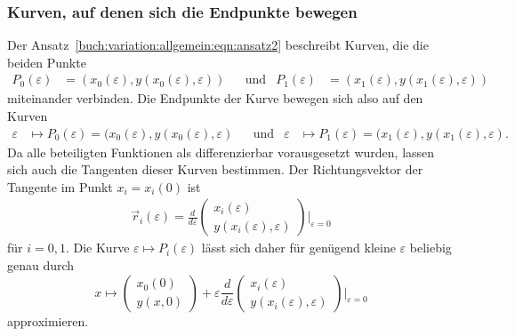 \subsubsection{Kurven, auf denen sich die Endpunkte bewegen}
Der Ansatz~\eqref{buch:variation:allgemein:eqn:ansatz2} beschreibt
Kurven, die die beiden Punkte
\begin{align*}
P_0(\varepsilon)
&=
(x_0(\varepsilon),y(x_0(\varepsilon),\varepsilon))
&&\text{und}&
P_1(\varepsilon)
&=
(x_1(\varepsilon),y(x_1(\varepsilon),\varepsilon))
\end{align*}
miteinander verbinden.
Die Endpunkte der Kurve bewegen sich also auf den Kurven
\begin{align*}
\varepsilon
&\mapsto
P_0(\varepsilon)
=
(x_0(\varepsilon),y(x_0(\varepsilon),\varepsilon)
&&\text{und}&
\varepsilon
&\mapsto
P_1(\varepsilon)
=
(x_1(\varepsilon),y(x_1(\varepsilon),\varepsilon).
\end{align*}
Da alle beteiligten Funktionen als differenzierbar vorausgesetzt wurden,
lassen sich auch die Tangenten dieser Kurven bestimmen.
Der Richtungsvektor der Tangente im Punkt $x_i=x_i(0)$ ist
\begin{align}
\vec{r}_i(\varepsilon)
=
\frac{d}{d\varepsilon}
\begin{pmatrix}
x_i(\varepsilon)\\
y(x_i(\varepsilon),\varepsilon)
\end{pmatrix}
\bigg|_{\varepsilon=0}
\label{buch:variation:allgemein:eqn:tangential}
\end{align}
für $i=0,1$.
Die Kurve $\varepsilon\mapsto P_i(\varepsilon)$ lässt sich daher für
genügend kleine $\varepsilon$ beliebig genau durch
\[
x\mapsto
\begin{pmatrix}
x_0(0)\\
y(x,0) 
\end{pmatrix}
+
\varepsilon
\frac{d}{d\varepsilon}
\begin{pmatrix}
x_i(\varepsilon)\\
y(x_i(\varepsilon),\varepsilon)
\end{pmatrix}
\bigg|_{\varepsilon=0}
\]
approximieren.

%
%
